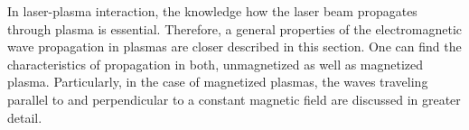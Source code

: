 In laser-plasma interaction, the knowledge how the laser beam propagates through plasma is essential. Therefore, a general properties of the electromagnetic wave propagation in plasmas are closer described in this section. One can find the characteristics of propagation in both, unmagnetized as well as magnetized plasma. Particularly, in the case of magnetized plasmas, the waves traveling parallel to and perpendicular to a constant magnetic field are discussed in greater detail.